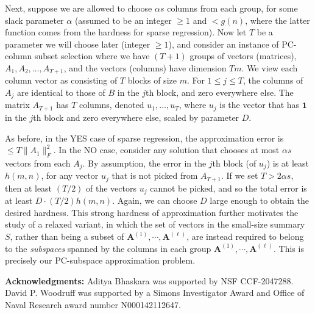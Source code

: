\documentclass[11pt]{article}
\makeatletter
\theoremstyle{plain}
\theoremstyle{plain}
\theoremstyle{definition}
\theoremstyle{plain}
\theoremstyle{remark}
\newenvironment{proof}[1][\protect\proofname]{\par
	\normalfont\topsep6\p@\@plus6\p@\relax
	\trivlist
	\itemindent\parindent
	\item[\hskip\labelsep\scshape #1]\ignorespaces
}{\endtrivlist\@endpefalse
}
\providecommand{\proofname}{Proof}
\DeclareRobustCommand{\fairCSSx}{PC-column subset selection}
\DeclareRobustCommand{\fairSA}{PC-subspace approximation }
\makeatother
\begin{document}
\begin{proof}
Next, suppose we are allowed to choose $\alpha s$ columns from each group, for some slack parameter $\alpha$ (assumed to be an integer $\ge 1$ and $< g(n)$, where the latter function comes from the hardness for sparse regression). Now let $T$ be a parameter we will choose later (integer $\ge 1$), and consider an instance of \fairCSSx{} where we have $(T + 1)$ groups of vectors (matrices), $A_1, A_2, \dots, A_{T+1}$, and the vectors (columns) have dimension $T m$. We view each column vector as consisting of $T$ blocks of size $m$. For $1\le j \le T$, the columns of $A_j$ are identical to those of $B$ in the $j$th block, and zero everywhere else. The matrix $A_{T+1}$ has $T$ columns, denoted $u_1, \dots, u_T$, where $u_{j}$ is the vector that has $\mathbf{1}$ in the $j$th block and zero everywhere else, scaled by parameter $D$.

As before, in the YES case of sparse regression, the approximation error is $\le T \| A_1\|_F^2$. In the NO case, consider any solution that chooses at most $\alpha s$ vectors from each $A_j$. By assumption, the error in the $j$th block (of $u_{j}$) is at least $h(m,n)$, for any vector $u_{j}$ that is not picked from $A_{T+1}$. If we set $T > 2\alpha s$, then at least $(T/2)$ of the vectors $u_{j}$ cannot be picked, and so the total error is at least $D \cdot (T/2) h(m, n)$. Again, we can choose $D$ large enough to obtain the desired hardness.
\end{proof}
This strong hardness of approximation further motivates the study of a relaxed variant, in which the set of vectors in the small-size summary $S$, rather than being a subset of $\bm{A}^{(1)}, \cdots, \bm{A}^{(\ell)}$, are instead required to belong to the {\em subspaces} spanned by the columns in each group $\bm{A}^{(1)}, \cdots, \bm{A}^{(\ell)}$. This is precisely our \fairSA{}problem.

{\bf Acknowledgments:} Aditya Bhaskara was supported by NSF CCF-2047288. David P. Woodruff was supported by a Simons Investigator Award and Office of Naval Research award number N000142112647.



\end{document}
